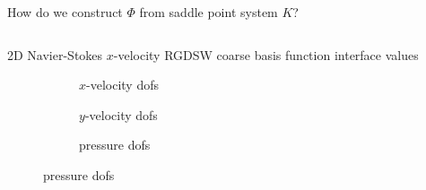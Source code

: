 \begin{frame}{How do we construct $\varPhi$ from saddle point system $K$?}
\begin{columns}
\begin{column}{0.52\textwidth}
{\begin{block}{\normalsize 2D Navier-Stokes $x$-velocity RGDSW coarse basis function interface values}
\begin{figure}
\begin{subfigure}{0.29\textwidth}
							
							\vspace*{-5mm}
							\caption{$x$-velocity dofs}
						\end{subfigure}
						\vfill
						\hspace*{-12mm}
						\begin{subfigure}{0.29\textwidth}
							\centering
							
							\vspace*{-5mm}
							\caption{$y$-velocity dofs}
						\end{subfigure}
						\hspace{12mm}
						\begin{subfigure}{0.29\textwidth}
							\centering
							
							\vspace*{-5mm}
							\caption{pressure dofs}
						\end{subfigure}
					\end{figure}
					\vspace{-3.5mm}
				\end{block}
			}
\end{column}
\end{columns}
\end{frame}
